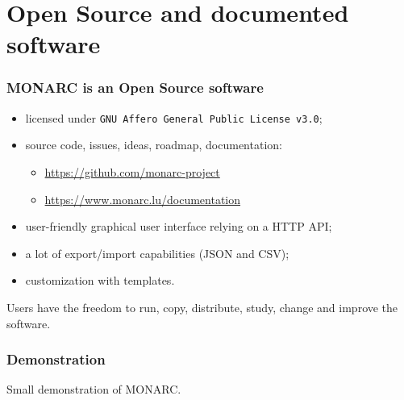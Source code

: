 \documentclass[]{beamer}
\begin{document}
\section{Open Source and documented software}
\begin{frame}
    \frametitle{MONARC is an Open Source software}
    \begin{center}
        \begin{itemize}
            \item licensed under \texttt{GNU Affero General Public License v3.0};
            \item source code, issues, ideas, roadmap, documentation:
            \begin{itemize}
                \item \url{https://github.com/monarc-project}
                \item \url{https://www.monarc.lu/documentation}
            \end{itemize}
            \item user-friendly graphical user interface relying on a HTTP API;
            \item a lot of export/import capabilities (JSON and CSV);
            \item customization with templates.
        \end{itemize}
    \end{center}
    \bigskip
    Users have the freedom to run, copy, distribute, study, change and improve the software.
\end{frame}

\begin{frame}
    \frametitle{Demonstration}
    Small demonstration of MONARC.
\end{frame}
\end{document}

